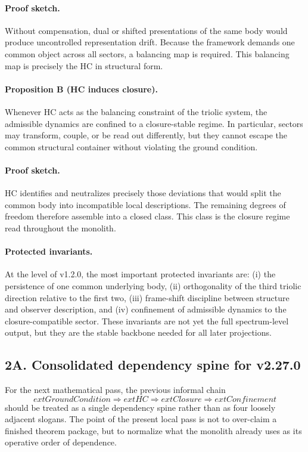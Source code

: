 \paragraph{Proof sketch.}
Without compensation, dual or shifted presentations of the same body would
produce uncontrolled representation drift. Because the framework demands one
common object across all sectors, a balancing map is required. This balancing
map is precisely the HC in structural form.

\paragraph{Proposition B (HC induces closure).}
Whenever HC acts as the balancing constraint of the triolic system, the
admissible dynamics are confined to a closure-stable regime. In particular,
sectors may transform, couple, or be read out differently, but they cannot
escape the common structural container without violating the ground condition.

\paragraph{Proof sketch.}
HC identifies and neutralizes precisely those deviations that would split the
common body into incompatible local descriptions. The remaining degrees of
freedom therefore assemble into a closed class. This class is the closure
regime read throughout the monolith.

\paragraph{Protected invariants.}
At the level of v1.2.0, the most important protected invariants are:
(i) the persistence of one common underlying body, (ii) orthogonality of the
third triolic direction relative to the first two, (iii) frame-shift discipline
between structure and observer description, and (iv) confinement of admissible
dynamics to the closure-compatible sector. These invariants are not yet the
full spectrum-level output, but they are the stable backbone needed for all
later projections.

\subsection*{2A. Consolidated dependency spine for v2.27.0}
For the next mathematical pass, the previous informal chain
\[
	ext{Ground Condition} \Longrightarrow 	ext{HC} \Longrightarrow 	ext{Closure} \Longrightarrow 	ext{Confinement}
\]
should be treated as a single dependency spine rather than as four loosely
adjacent slogans. The point of the present local pass is not to over-claim a
finished theorem package, but to normalize what the monolith already uses as
its operative order of dependence.

